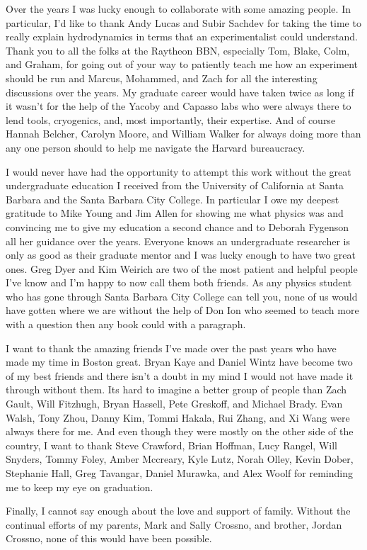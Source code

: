 Over the years I was lucky enough to collaborate with some amazing people. In particular, I'd like to thank Andy Lucas and Subir Sachdev for taking the time to really explain hydrodynamics in terms that an experimentalist could understand. Thank you to all the folks at the Raytheon BBN, especially Tom, Blake, Colm, and Graham, for going out of your way to patiently teach me how an experiment should be run and Marcus, Mohammed, and Zach for all the interesting discussions over the years. My graduate career would have taken twice as long if it wasn't for the help of the Yacoby and Capasso labs who were always there to lend tools, cryogenics, and, most importantly, their expertise. And of course Hannah Belcher, Carolyn Moore, and William Walker for always doing more than any one person should to help me navigate the Harvard bureaucracy.

I would never have had the opportunity to attempt this work without the great undergraduate education I received from the University of California at Santa Barbara and the Santa Barbara City College. In particular I owe my deepest gratitude to Mike Young and Jim Allen for showing me what physics was and convincing me to give my education a second chance and to Deborah Fygenson all her guidance over the years. Everyone knows an undergraduate researcher is only as good as their graduate mentor and I was lucky enough to have two great ones. Greg Dyer and Kim Weirich are two of the most patient and helpful people I've know and I'm happy to now call them both friends. As any physics student who has gone through Santa Barbara City College can tell you, none of us would have gotten where we are without the help of Don Ion who seemed to teach more with a question then any book could with a paragraph.

I want to thank the amazing friends I've made over the past years who have made my time in Boston great. Bryan Kaye and Daniel Wintz have become two of my best friends and there isn't a doubt in my mind I would not have made it through without them. Its hard to imagine a better group of people than Zach Gault, Will Fitzhugh, Bryan Hassell, Pete Greskoff, and Michael Brady. Evan Walsh, Tony Zhou, Danny Kim, Tommi Hakala, Rui Zhang, and Xi Wang were always there for me. And even though they were mostly on the other side of the country, I want to thank Steve Crawford, Brian Hoffman, Lucy Rangel, Will Snyders, Tommy Foley, Amber Mccreary, Kyle Lutz, Norah Olley, Kevin Dober, Stephanie Hall, Greg Tavangar, Daniel Murawka, and Alex Woolf for reminding me to keep my eye on graduation. 

Finally, I cannot say enough about the love and support of family. Without the continual efforts of my parents, Mark and Sally Crossno, and brother, Jordan Crossno, none of this would have been possible. 